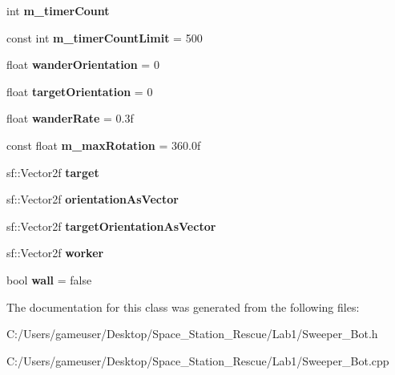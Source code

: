 \begin{DoxyCompactItemize}
int {\bfseries m\+\_\+timer\+Count}
\item 
\mbox{\label{class_sweeper___bot_a64f87d417fc8c8ca65d2350645a6956d}} 
const int {\bfseries m\+\_\+timer\+Count\+Limit} = 500
\item 
\mbox{\label{class_sweeper___bot_a87ef355a7efc0e5655c0d61d07217015}} 
float {\bfseries wander\+Orientation} = 0
\item 
\mbox{\label{class_sweeper___bot_a344ef0575d5be1748a9f58c6487b65b1}} 
float {\bfseries target\+Orientation} = 0
\item 
\mbox{\label{class_sweeper___bot_a69eb9e368eb0e0507f7fd5190e607efb}} 
float {\bfseries wander\+Rate} = 0.\+3f
\item 
\mbox{\label{class_sweeper___bot_a436178d2fbc26859be4fd1e544c9183c}} 
const float {\bfseries m\+\_\+max\+Rotation} = 360.\+0f
\item 
\mbox{\label{class_sweeper___bot_a59a863940e14b3c2dd17756c0b3462df}} 
sf\+::\+Vector2f {\bfseries target}
\item 
\mbox{\label{class_sweeper___bot_afdd0ff7a5ecc39f1b21c724a8a87201f}} 
sf\+::\+Vector2f {\bfseries orientation\+As\+Vector}
\item 
\mbox{\label{class_sweeper___bot_a2bcb6b1e3be80211cdc927f8026c2b21}} 
sf\+::\+Vector2f {\bfseries target\+Orientation\+As\+Vector}
\item 
\mbox{\label{class_sweeper___bot_ad08eadbec453e38b951bcb36c9aa5001}} 
sf\+::\+Vector2f {\bfseries worker}
\item 
\mbox{\label{class_sweeper___bot_aff14e5de000fd56ccf0ec47f3d5ee053}} 
bool {\bfseries wall} = false
\end{DoxyCompactItemize}


The documentation for this class was generated from the following files\+:\begin{DoxyCompactItemize}
\item 
C\+:/\+Users/gameuser/\+Desktop/\+Space\+\_\+\+Station\+\_\+\+Rescue/\+Lab1/Sweeper\+\_\+\+Bot.\+h\item 
C\+:/\+Users/gameuser/\+Desktop/\+Space\+\_\+\+Station\+\_\+\+Rescue/\+Lab1/Sweeper\+\_\+\+Bot.\+cpp\end{DoxyCompactItemize}
